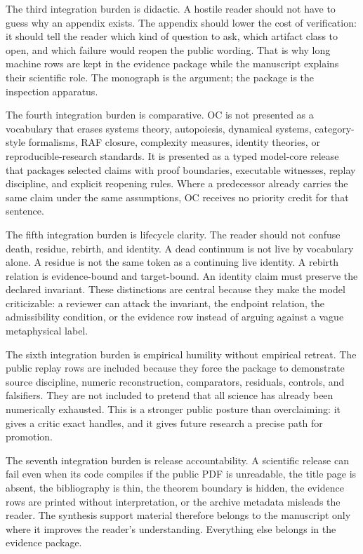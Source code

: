 The third integration burden is didactic. A hostile reader should not have to guess why an appendix exists. The appendix should lower the cost of verification: it should tell the reader which kind of question to ask, which artifact class to open, and which failure would reopen the public wording. That is why long machine rows are kept in the evidence package while the manuscript explains their scientific role. The monograph is the argument; the package is the inspection apparatus.


The fourth integration burden is comparative. OC is not presented as a vocabulary that erases systems theory, autopoiesis, dynamical systems, category-style formalisms, RAF closure, complexity measures, identity theories, or reproducible-research standards. It is presented as a typed model-core release that packages selected claims with proof boundaries, executable witnesses, replay discipline, and explicit reopening rules. Where a predecessor already carries the same claim under the same assumptions, OC receives no priority credit for that sentence.


The fifth integration burden is lifecycle clarity. The reader should not confuse death, residue, rebirth, and identity. A dead continuum is not live by vocabulary alone. A residue is not the same token as a continuing live identity. A rebirth relation is evidence-bound and target-bound. An identity claim must preserve the declared invariant. These distinctions are central because they make the model criticizable: a reviewer can attack the invariant, the endpoint relation, the admissibility condition, or the evidence row instead of arguing against a vague metaphysical label.


The sixth integration burden is empirical humility without empirical retreat. The public replay rows are included because they force the package to demonstrate source discipline, numeric reconstruction, comparators, residuals, controls, and falsifiers. They are not included to pretend that all science has already been numerically exhausted. This is a stronger public posture than overclaiming: it gives a critic exact handles, and it gives future research a precise path for promotion.


The seventh integration burden is release accountability. A scientific release can fail even when its code compiles if the public PDF is unreadable, the title page is absent, the bibliography is thin, the theorem boundary is hidden, the evidence rows are printed without interpretation, or the archive metadata misleads the reader. The synthesis support material therefore belongs to the manuscript only where it improves the reader's understanding. Everything else belongs in the evidence package.


